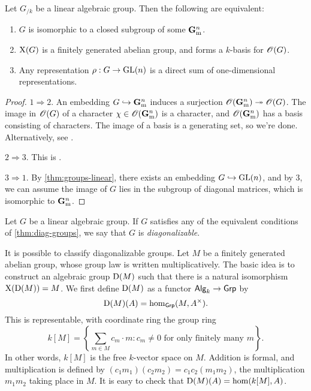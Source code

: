\begin{theorem}\label{thm:diag-groups}
Let $G_{/k}$ be a linear algebraic group. Then the following are equivalent: 
\begin{enumerate}
\item
$G$ is isomorphic to a closed subgroup of some $\mathbf{G}_\mathrm{m}^n$. 

\item
$\operatorname{X}(G)$ is a finitely generated abelian group, and forms a $k$-basis 
for $\mathscr{O}(G)$. 

\item 
Any representation $\rho:G\to \operatorname{GL}(n)$ is a direct sum of one-dimensional 
representations. 
\end{enumerate}
\end{theorem}
\begin{proof}
$1\Rightarrow 2$. An embedding $G\hookrightarrow \mathbf{G}_\mathrm{m}^n$ induces a surjection 
$\mathscr{O}(\mathbf{G}_\mathrm{m}^n)\twoheadrightarrow \mathscr{O}(G)$. The image in $\mathscr{O}(G)$ of a character 
$\chi\in \mathscr{O}(\mathbf{G}_\mathrm{m}^n)$ is a character, and $\mathscr{O}(\mathbf{G}_\mathrm{m}^n)$ has a basis consisting 
of characters. The image of a basis is a generating set, so we're done. 
Alternatively, see \cite[14.8]{milne-iAG}. 

$2\Rightarrow 3$. This is \cite[14.11]{milne-iAG}. 

$3\Rightarrow 1$. By \autoref{thm:groups-linear}, there exists an embedding 
$G\hookrightarrow \operatorname{GL}(n)$, and by 3, we can assume the image of $G$ lies in the 
subgroup of diagonal matrices, which is isomorphic to $\mathbf{G}_\mathrm{m}^n$. 
\end{proof}

\begin{definition}
Let $G$ be a linear algebraic group. If $G$ satisfies any of the 
equivalent conditions of \autoref{thm:diag-groups}, we say that $G$ is 
\emph{diagonalizable}. 
\end{definition}

It is possible to classify diagonalizable groups. Let $M$ be a finitely 
generated abelian group, whose group law is written multiplicatively. The basic 
idea is to construct an algebraic group $\operatorname{D}(M)$ such that there is a 
natural isomorphism $\operatorname{X}(\operatorname{D}(M)) = M$. We first define $\operatorname{D}(M)$ as 
a functor $\mathsf{Alg}_{k}\to \mathsf{Grp}$ by 
\[
  \operatorname{D}(M)(A) = \hom_{\mathsf{Grp}}(M,A^\times) .
\]
This is representable, with coordinate ring the group ring 
\[
  k[M] = \left\{\sum_{m\in M} c_m\cdot m : c_m\ne 0\text{ for only finitely many }m\right\} .
\]
In other words, $k[M]$ is the free $k$-vector space on $M$. Addition is formal, 
and multiplication is defined by $(c_1 m_1)(c_2 m_2) = c_1 c_2 (m_1 m_2)$, the 
multiplication $m_1 m_2$ taking place in $M$. It is easy to check that 
$\operatorname{D}(M)(A)=\hom(k[M],A)$. 

